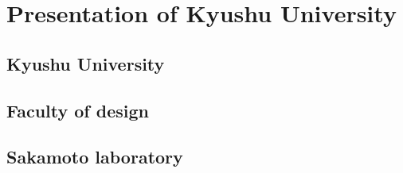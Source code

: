 \section{Presentation of Kyushu University}
\subsection{Kyushu University}
\subsection{Faculty of design}
\subsection{Sakamoto laboratory}